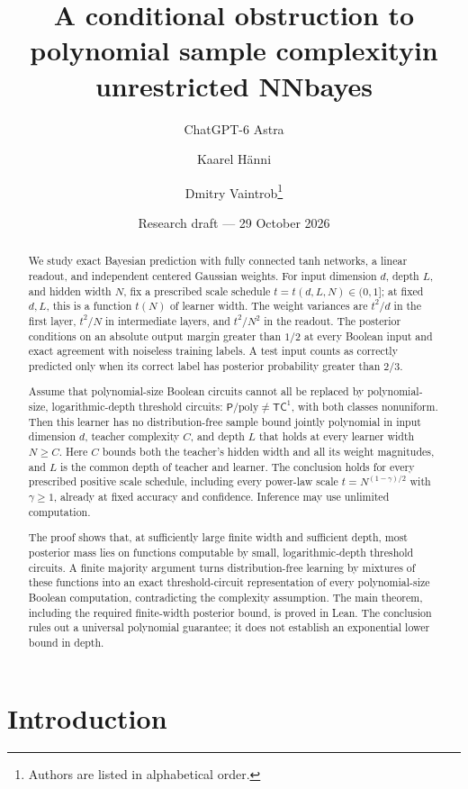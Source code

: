 \documentclass[11pt]{article}
\title{A conditional obstruction to polynomial sample complexity\newline in unrestricted NNbayes}
\author{ChatGPT-6 Astra \and Kaarel H\"anni \and Dmitry Vaintrob\thanks{Authors are listed in alphabetical order.}}
\date{Research draft --- 29 October 2026}
\theoremstyle{remark}\newtheorem{remark}[theorem]{Remark}
\newcommand{\Pp}{\mathsf P/\mathrm{poly}}
\newcommand{\TC}{\mathsf{TC}}
\begin{document}
\maketitle

\begin{abstract}
We study exact Bayesian prediction with fully connected tanh networks,
a linear readout, and independent centered Gaussian weights. For input
dimension $d$, depth $L$, and hidden width $N$, fix a prescribed scale
schedule $t=t(d,L,N)\in(0,1]$; at fixed $d,L$, this is a function $t(N)$
of learner width. The weight variances are $t^2/d$ in the first layer, $t^2/N$ in intermediate layers, and
$t^2/N^2$ in the readout. The posterior conditions on an absolute output
margin greater than $1/2$ at every Boolean input and exact agreement with
noiseless training labels. A test input counts as correctly predicted
only when its correct label has posterior probability greater than $2/3$.

Assume that polynomial-size Boolean circuits cannot all be replaced by
polynomial-size, logarithmic-depth threshold circuits:
$\Pp\ne\TC^1$, with both classes nonuniform.
Then this learner has no distribution-free sample bound jointly
polynomial in input dimension $d$, teacher complexity $C$, and depth $L$
that holds at every learner width $N\ge C$. Here $C$ bounds both the
teacher's hidden width and all its weight magnitudes, and $L$ is the
common depth of teacher and learner. The conclusion holds for every
prescribed positive scale schedule, including every power-law scale
$t=N^{(1-\gamma)/2}$ with $\gamma\ge1$, already at fixed accuracy and
confidence. Inference may use unlimited computation.

The proof shows that, at sufficiently large finite width and sufficient
depth, most posterior mass lies on functions computable by small,
logarithmic-depth threshold circuits. A finite majority
argument turns distribution-free learning by mixtures of these functions
into an exact threshold-circuit representation of every polynomial-size
Boolean computation, contradicting the complexity assumption. The main
theorem, including the required finite-width posterior bound, is proved
in Lean. The conclusion rules out a universal polynomial guarantee;
it does not establish an exponential lower bound in depth.
\end{abstract}

\section{Introduction}
\end{document}

